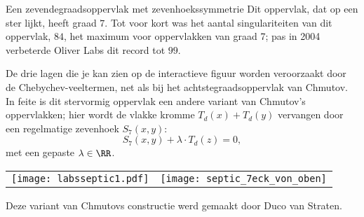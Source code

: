 \begin{surferPage}[Zevenhoek]{Een zevendegraadsoppervlak met zevenhoekssymmetrie}
   Dit oppervlak, dat op een ster lijkt, heeft graad $7$.  
    Tot voor kort was het aantal singulariteiten van dit oppervlak, $84$, het maximum voor oppervlakken van graad 7;
    pas in 2004 verbeterde Oliver Labs dit record tot $99$.
  
  
De drie lagen die je kan zien op de interactieve figuur worden veroorzaakt door de Chebychev-veeltermen, net als bij het achtstegraadsoppervlak van Chmutov. 
    In feite is dit stervormig oppervlak een andere variant van Chmutov's oppervlakken; hier wordt de vlakke kromme $T_d(x)+T_d(y)$ vervangen door een regelmatige zevenhoek $S_7(x,y)$: 
   \[S_7(x,y) + \lambda \cdot T_d(z) = 0,\]
    met een gepaste $\lambda\in\RR$. 
    \vspace*{-0.3em}
    \begin{center}
      \begin{tabular}{c@{\qquad}c}
        \texttt{[image: labsseptic1.pdf]}
        &
        \texttt{[image: septic\_7eck\_von\_oben]}
      \end{tabular}
    \end{center}
    \vspace*{-0.3em}   
   Deze variant van Chmutovs constructie werd gemaakt door Duco van Straten.
\end{surferPage}
